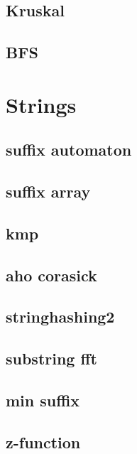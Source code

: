 \subsection{Kruskal}
\raggedbottom
\hrulefill
\subsection{BFS}
\raggedbottom
\hrulefill

\section{Strings}
\subsection{suffix automaton}
\raggedbottom
\hrulefill
\subsection{suffix array}
\raggedbottom
\hrulefill
\subsection{kmp}
\raggedbottom
\hrulefill
\subsection{aho corasick}
\raggedbottom
\hrulefill
\subsection{stringhashing2}
\raggedbottom
\hrulefill
\subsection{substring fft}
\raggedbottom
\hrulefill
\subsection{min suffix}
\raggedbottom
\hrulefill
\subsection{z-function}
\raggedbottom
\hrulefill
